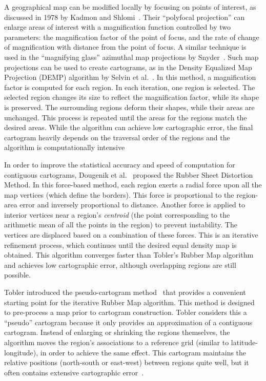 \documentclass{egpubl}
\begin{document}
A geographical map can be modified locally by focusing on points of interest, as discussed in 1978 by Kadmon and Shlomi~\cite{kadmon1978polyfocal}. Their ``polyfocal projection'' can enlarge areas of interest with a magnification function controlled by two parameters: the magnification factor of the point of focus, and the rate of change of magnification with distance from the point of focus.
A similar technique is used in the ``magnifying glass'' azimuthal map projections by Snyder~\cite{snyder1987magnifying}. 
Such map projections can be used to create cartograms, as in the Density Equalized Map Projection (DEMP) algorithm
by Selvin et al.~\cite{selvin1988transformations}. In this method, a magnification factor is computed for each region. In each iteration, one region is selected. The selected
   region changes its size to reflect the magnification factor, while its
   shape is preserved. The surrounding regions deform their shapes,
   while their areas are unchanged. This process is repeated until the areas for the regions match the desired areas. While the algorithm can achieve low cartographic error, the final cartogram heavily depends on the traversal order of the regions and the algorithm is computationally intensive~\cite{selvin1988transformations}


In order to improve the statistical accuracy and speed of computation for contiguous cartograms, Dougenik et al.~\cite{DCN85} proposed the Rubber Sheet Distortion Method. In this force-based method, each region exerts a radial force upon all the map vertices (which define the borders). This force is proportional to the region-area error and inversely proportional to distance. Another force is applied to interior vertices near a region's \textit{centroid} (the point corresponding to the arithmetic mean of all the points in the region) to prevent instability. The vertices are displaced based on a combination of these forces. This is an iterative refinement process,  which continues until the desired equal density map is obtained.
This algorithm converges faster than Tobler's Rubber Map algorithm and achieves low cartographic error, although overlapping regions are still possible.


 Tobler introduced the pseudo-cartogram method~\cite{tobler1986pseudo} that provides a convenient starting point for the iterative Rubber Map algorithm. This method is designed to pre-process a map prior to cartogram construction.
Tobler considers this a ``pseudo'' cartogram because it only provides an approximation of a contiguous cartogram. Instead of enlarging or shrinking the regions themselves, the algorithm moves the region's associations to a reference grid (similar to latitude-longitude), in order to achieve the same effect. This cartogram maintains the relative positions (north-south or east-west) between regions quite well, but it often contains extensive cartographic error~\cite{Demers}.
\end{document}

